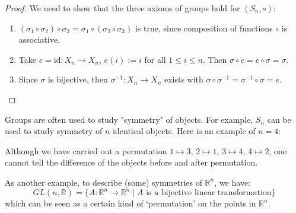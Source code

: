 \begin{proof} We need to show that the three axioms of groups hold for $(S_n, \circ)$:
\begin{enumerate}
    \item $(\sigma_1 \circ \sigma_2) \circ \sigma_3 = \sigma_1 \circ (\sigma_2 \circ \sigma_3)$ is true, since composition of functions $\circ$ is associative.
    \item Take $e = \text{id} : X_n \to X_n$, $e(i) := i$ for all $1 \leq i \leq n$. Then $\sigma \circ e = e \circ \sigma = \sigma$.
    \item Since $\sigma$ is bijective, then $\sigma^{-1} : X_n \to X_n$ exists with $\sigma \circ \sigma^{-1} = \sigma^{-1} \circ \sigma = e$.
\end{enumerate}
\end{proof}


\begin{remark} \label{rmk-symmetrysn}
Groups are often used to study "symmetry" of objects. For example, $S_n$ can be used to study symmetry of $n$ identical objects. Here is an example of $n=4$:
\begin{center}
\end{center}
Although we have carried out a permutation $1 \mapsto 3$, $2 \mapsto 1$, $3 \mapsto 4$, $4 \mapsto 2$, one cannot tell the difference of the objects before and after permutation. 

As another example, to describe (some) symmetries of $\mathbb{R}^n$, we have: 
$$GL(n, \mathbb{R}) = \{ A : \mathbb{R}^n \to \mathbb{R}^n \mid A \text{ is a bijective linear transformation} \}$$
which can be seen as a certain kind of `permutation' on the points in $\mathbb{R}^n$.
\end{remark}

